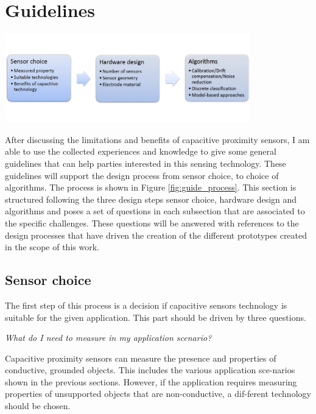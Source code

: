 \section{Guidelines}
\begin{minipage}{\linewidth}
\centering
\includegraphics[width=0.8\textwidth]{images/guide_process}
\label{fig:guide_process}
\end{minipage}

After discussing the limitations and benefits of capacitive proximity sensors, I am able to use the collected experiences and knowledge to give some general guidelines that can help parties interested in this sensing technology. These guidelines will support the design process from sensor choice, to choice of algorithms. The process is shown in Figure \ref{fig:guide_process}. This section is structured following the three design steps sensor choice, hardware design and algorithms and poses a set of questions in each subsection that are associated to the specific challenges. These questions will be answered with references to the design processes that have driven the creation of the different prototypes created in the scope of this work.
 
\subsection{Sensor choice}
The first step of this process is a decision if capacitive sensors technology is suitable for the given application. This part should be driven by three questions.

\textit{What do I need to measure in my application scenario?
}

Capacitive proximity sensors can measure the presence and properties of conductive, grounded objects. This includes the various application sce-narios shown in the previous sections. However, if the application requires measuring properties of unsupported objects that are non-conductive, a dif-ferent technology should be chosen.

